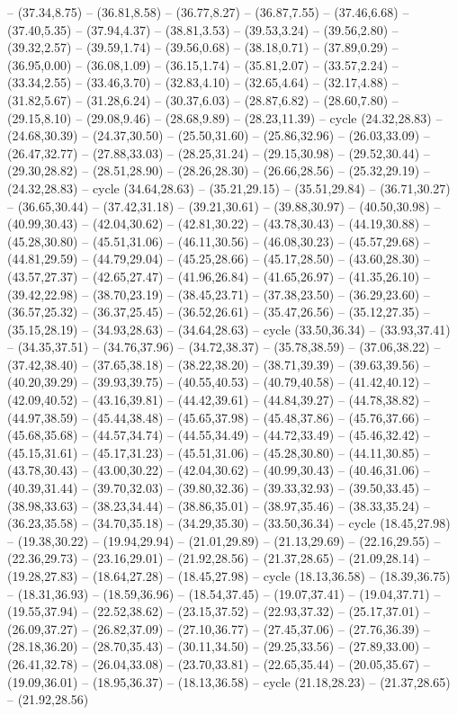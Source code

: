 {-- (37.34,8.75) -- (36.81,8.58) -- (36.77,8.27) -- (36.87,7.55) -- (37.46,6.68) -- (37.40,5.35) -- (37.94,4.37) -- (38.81,3.53) -- (39.53,3.24) -- (39.56,2.80) -- (39.32,2.57) -- (39.59,1.74) -- (39.56,0.68) -- (38.18,0.71) -- (37.89,0.29) -- (36.95,0.00) -- (36.08,1.09) -- (36.15,1.74) -- (35.81,2.07) -- (33.57,2.24) -- (33.34,2.55) -- (33.46,3.70) -- (32.83,4.10) -- (32.65,4.64) -- (32.17,4.88) -- (31.82,5.67) -- (31.28,6.24) -- (30.37,6.03) -- (28.87,6.82) -- (28.60,7.80) -- (29.15,8.10) -- (29.08,9.46) -- (28.68,9.89) -- (28.23,11.39) -- cycle (24.32,28.83) -- (24.68,30.39) -- (24.37,30.50) -- (25.50,31.60) -- (25.86,32.96) -- (26.03,33.09) -- (26.47,32.77) -- (27.88,33.03) -- (28.25,31.24) -- (29.15,30.98) -- (29.52,30.44) -- (29.30,28.82) -- (28.51,28.90) -- (28.26,28.30) -- (26.66,28.56) -- (25.32,29.19) -- (24.32,28.83) -- cycle (34.64,28.63) -- (35.21,29.15) -- (35.51,29.84) -- (36.71,30.27) -- (36.65,30.44) -- (37.42,31.18) -- (39.21,30.61) -- (39.88,30.97) -- (40.50,30.98) -- (40.99,30.43) -- (42.04,30.62) -- (42.81,30.22) -- (43.78,30.43) -- (44.19,30.88) -- (45.28,30.80) -- (45.51,31.06) -- (46.11,30.56) -- (46.08,30.23) -- (45.57,29.68) -- (44.81,29.59) -- (44.79,29.04) -- (45.25,28.66) -- (45.17,28.50) -- (43.60,28.30) -- (43.57,27.37) -- (42.65,27.47) -- (41.96,26.84) -- (41.65,26.97) -- (41.35,26.10) -- (39.42,22.98) -- (38.70,23.19) -- (38.45,23.71) -- (37.38,23.50) -- (36.29,23.60) -- (36.57,25.32) -- (36.37,25.45) -- (36.52,26.61) -- (35.47,26.56) -- (35.12,27.35) -- (35.15,28.19) -- (34.93,28.63) -- (34.64,28.63) -- cycle (33.50,36.34) -- (33.93,37.41) -- (34.35,37.51) -- (34.76,37.96) -- (34.72,38.37) -- (35.78,38.59) -- (37.06,38.22) -- (37.42,38.40) -- (37.65,38.18) -- (38.22,38.20) -- (38.71,39.39) -- (39.63,39.56) -- (40.20,39.29) -- (39.93,39.75) -- (40.55,40.53) -- (40.79,40.58) -- (41.42,40.12) -- (42.09,40.52) -- (43.16,39.81) -- (44.42,39.61) -- (44.84,39.27) -- (44.78,38.82) -- (44.97,38.59) -- (45.44,38.48) -- (45.65,37.98) -- (45.48,37.86) -- (45.76,37.66) -- (45.68,35.68) -- (44.57,34.74) -- (44.55,34.49) -- (44.72,33.49) -- (45.46,32.42) -- (45.15,31.61) -- (45.17,31.23) -- (45.51,31.06) -- (45.28,30.80) -- (44.11,30.85) -- (43.78,30.43) -- (43.00,30.22) -- (42.04,30.62) -- (40.99,30.43) -- (40.46,31.06) -- (40.39,31.44) -- (39.70,32.03) -- (39.80,32.36) -- (39.33,32.93) -- (39.50,33.45) -- (38.98,33.63) -- (38.23,34.44) -- (38.86,35.01) -- (38.97,35.46) -- (38.33,35.24) -- (36.23,35.58) -- (34.70,35.18) -- (34.29,35.30) -- (33.50,36.34) -- cycle (18.45,27.98) -- (19.38,30.22) -- (19.94,29.94) -- (21.01,29.89) -- (21.13,29.69) -- (22.16,29.55) -- (22.36,29.73) -- (23.16,29.01) -- (21.92,28.56) -- (21.37,28.65) -- (21.09,28.14) -- (19.28,27.83) -- (18.64,27.28) -- (18.45,27.98) -- cycle (18.13,36.58) -- (18.39,36.75) -- (18.31,36.93) -- (18.59,36.96) -- (18.54,37.45) -- (19.07,37.41) -- (19.04,37.71) -- (19.55,37.94) -- (22.52,38.62) -- (23.15,37.52) -- (22.93,37.32) -- (25.17,37.01) -- (26.09,37.27) -- (26.82,37.09) -- (27.10,36.77) -- (27.45,37.06) -- (27.76,36.39) -- (28.18,36.20) -- (28.70,35.43) -- (30.11,34.50) -- (29.25,33.56) -- (27.89,33.00) -- (26.41,32.78) -- (26.04,33.08) -- (23.70,33.81) -- (22.65,35.44) -- (20.05,35.67) -- (19.09,36.01) -- (18.95,36.37) -- (18.13,36.58) -- cycle (21.18,28.23) -- (21.37,28.65) -- (21.92,28.56) }
